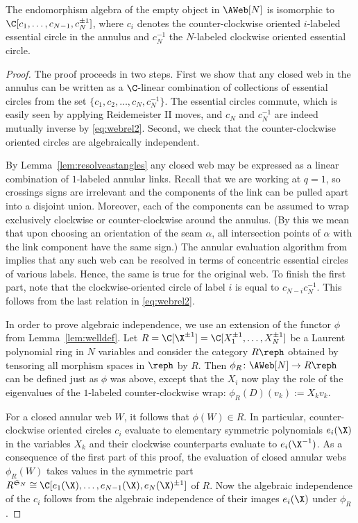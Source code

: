 \begin{lemma}\label{lem:endempty} The endomorphism algebra of the empty object
in $\AWeb[N]$ is isomorphic to $\C[c_1,\dots, c_{N-1}, c_N^{\pm 1}]$, where
$c_i$ denotes the counter-clockwise oriented $i$-labeled essential circle in the
annulus and $c_N^{-1}$ the $N$-labeled clockwise oriented essential circle.
\end{lemma}
\begin{proof}
The proof proceeds in two steps. First we show that any closed web in the
annulus can be written as a $\C$-linear combination of collections of essential
circles from the set $\{c_1,c_2, \dots, c_N, c_N^{-1}\}$. The essential circles
commute, which is easily seen by applying Reidemeister II moves, and $c_N$ and
$c_N^{-1}$ are indeed mutually inverse by \eqref{eq:webrel2}. Second, we check that the
counter-clockwise oriented circles are algebraically independent. 

  By Lemma~\ref{lem:resolveastangles} any closed web may be expressed as a linear
    combination of $1$-labeled annular links. Recall that we are working at $q=1$,
    so crossings signs are irrelevant and the components of the link can be pulled
    apart into a disjoint union. Moreover, each of the components can be assumed
    to wrap exclusively clockwise or counter-clockwise around the annulus. (By
    this we mean that upon choosing an orientation of the seam $\alpha$, all
    intersection points of $\alpha$ with the link component have the same sign.)
    The annular evaluation algorithm from \cite[Lemma 5.2]{QR2} implies that any
    such web can be resolved in terms of concentric essential circles of various
    labels. Hence, the same is true for the original web. To finish the first
    part, note that the clockwise-oriented circle of label $i$ is equal to
    $c_{N-i}c_N^{-1}$. This follows from the last relation in \eqref{eq:webrel2}. 




In order to prove algebraic independence, we use an extension of the functor
$\phi$ from Lemma~\ref{lem:welldef}. Let $R=\C[\X^{\pm 1} ]=\C[X_1^{\pm
1},\dots, X_N^{\pm 1}]$ be a Laurent polynomial ring in $N$ variables and
consider the category $R\reph$ obtained by tensoring all morphism spaces in
$\reph$ by $R$. Then $\phi_R\colon \AWeb[N] \to R\reph$ can be defined just as
$\phi$ was above, except that the $X_i$ now play the role of the eigenvalues of
the $1$-labeled counter-clockwise wrap: $\phi_R(D)(v_k):=X_k v_k$. 

For a closed annular web $W$, it follows that $\phi(W)\in R$. In particular,
counter-clockwise oriented circles $c_i$ evaluate to elementary symmetric
polynomials $e_i(\X)$ in the variables $X_k$ and their clockwise counterparts
evaluate to $e_i(\X^{-1})$. As a consequence of the first part of this proof,
the evaluation of closed annular webs $\phi_R(W)$ takes values in the symmetric
part $R^{\mathfrak{S}_N} \cong \C[e_1(\X),\dots, e_{N-1}(\X), e_{N}(\X)^{\pm
1}]$ of $R$. Now the algebraic independence of the $c_i$ follows from the
algebraic independence of their images $e_i(\X)$ under $\phi_R$.
\end{proof}

